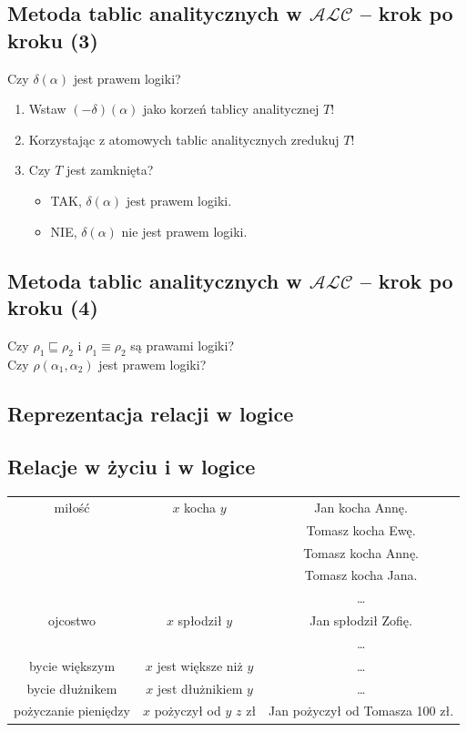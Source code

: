 \documentclass[12pt]{article}
\begin{document}
\subsection{Metoda tablic analitycznych w $\mathcal{ALC}$ -- krok po kroku (3)}
Czy $\delta(\alpha)$ jest prawem logiki?
%
\begin{enumerate}
\item Wstaw $(- \delta)(\alpha)$ jako korzeń tablicy analitycznej $T$!
%
\item Korzystając z atomowych tablic analitycznych zredukuj $T$!
%
\item Czy $T$ jest zamknięta?
%
\begin{itemize}
\item \textcolor[rgb]{0.00,1.00,0.00}{TAK}, $\delta(\alpha)$ \textcolor[rgb]{0.00,1.00,0.00}{jest} prawem logiki.
%
\item \textcolor[rgb]{1.00,0.00,0.00}{NIE}, $\delta(\alpha)$ \textcolor[rgb]{0.98,0.00,0.00}{nie jest} prawem logiki.
\end{itemize}
\end{enumerate}
%

\subsection{Metoda tablic analitycznych w $\mathcal{ALC}$ -- krok po kroku (4)}
%
Czy $\rho_{1} \sqsubseteq \rho_{2}$ i $\rho_{1} \equiv \rho_{2}$ są prawami logiki?\\
%
Czy $\rho(\alpha_{1},\alpha_{2})$ jest prawem logiki?
%

\subsection{Reprezentacja relacji w logice}

\subsection{Relacje w życiu i w logice}
%
\begin{center}
\begin{table}
{\scriptsize
\begin{tabular}{|c|c|c|}
\hline
miłość & $x$ kocha $y$ & Jan kocha Annę.\\
\cline{3-3}
& & Tomasz kocha Ewę.\\
\cline{3-3}
& & Tomasz kocha Annę.\\
\cline{3-3}
& & Tomasz kocha Jana. \\
\cline{3-3}
& & \dots \\
\hline
ojcostwo & $x$ spłodził $y$ & Jan spłodził Zofię.\\
\cline{3-3}
& & \dots \\
\hline
bycie większym & $x$ jest większe niż $y$ & \dots \\
\hline
bycie dłużnikem & $x$ jest dłużnikiem $y$ & \dots \\
\hline
pożyczanie pieniędzy & $x$ pożyczył od $y$ $z$ zł & Jan pożyczył od Tomasza 100 zł. \\
\hline
\end{tabular}
}
\end{table}
\end{center}
%
\end{document}
